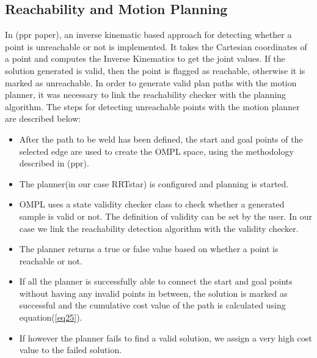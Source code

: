 \subsection{Reachability and Motion Planning}
In (ppr paper), an inverse kinematic based approach for detecting whether a point is unreachable or not is implemented. It takes the Cartesian coordinates of a point and computes the Inverse Kinematics to get the joint values. If the solution generated is valid, then the point is flagged as reachable, otherwise it is marked as unreachable. In order to generate valid plan paths with the motion planner, it was necessary to link the reachability checker with the planning algorithm. 
The steps for detecting unreachable points with the motion planner are described below:
\begin{itemize}
	\item After the path to be weld has been defined, the start and goal points of the selected edge are used to create the OMPL space, using the methodology described in (ppr).
	\item The planner(in our case RRTstar) is configured and planning is started.
	\item OMPL uses a state validity checker class to check whether a generated sample is valid or not. The definition of validity can be set by the user. In our case we link the reachability detection algorithm with the validity checker.
	\item The planner returns a true or false value based on whether a point is reachable or not.
	\item If all the planner is successfully able to connect the start and goal points without having any invalid points in between, the solution is marked as successful and the cumulative cost value of the path is calculated using equation(\ref{eq25}).
	\item If however the planner fails to find a valid solution, we assign a very high cost value to the failed solution. 
\end{itemize} 

